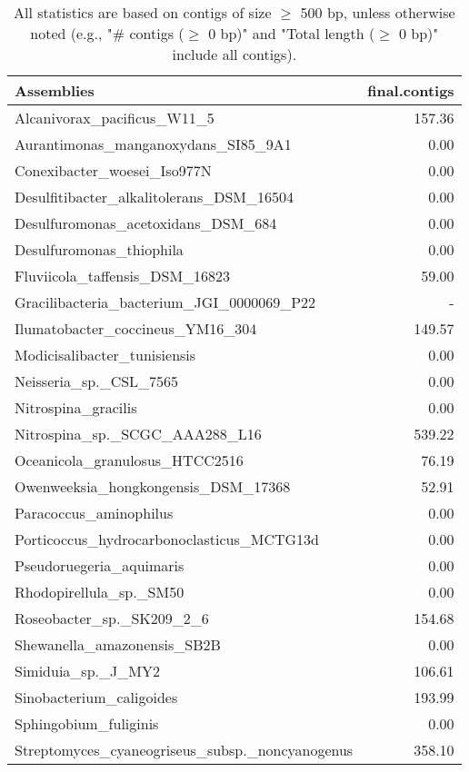 \documentclass[12pt,a4paper]{article}
\begin{document}
\begin{table}[ht]
\begin{center}
\caption{All statistics are based on contigs of size $\geq$ 500 bp, unless otherwise noted (e.g., "\# contigs ($\geq$ 0 bp)" and "Total length ($\geq$ 0 bp)" include all contigs).}
\begin{tabular}{|l*{1}{|r}|}
\hline
Assemblies & final.contigs \\ \hline
Alcanivorax\_pacificus\_W11\_5 & 157.36 \\ \hline
Aurantimonas\_manganoxydans\_SI85\_9A1 & 0.00 \\ \hline
Conexibacter\_woesei\_Iso977N & 0.00 \\ \hline
Desulfitibacter\_alkalitolerans\_DSM\_16504 & 0.00 \\ \hline
Desulfuromonas\_acetoxidans\_DSM\_684 & 0.00 \\ \hline
Desulfuromonas\_thiophila & 0.00 \\ \hline
Fluviicola\_taffensis\_DSM\_16823 & 59.00 \\ \hline
Gracilibacteria\_bacterium\_JGI\_0000069\_P22 & - \\ \hline
Ilumatobacter\_coccineus\_YM16\_304 & 149.57 \\ \hline
Modicisalibacter\_tunisiensis & 0.00 \\ \hline
Neisseria\_sp.\_CSL\_7565 & 0.00 \\ \hline
Nitrospina\_gracilis & 0.00 \\ \hline
Nitrospina\_sp.\_SCGC\_AAA288\_L16 & 539.22 \\ \hline
Oceanicola\_granulosus\_HTCC2516 & 76.19 \\ \hline
Owenweeksia\_hongkongensis\_DSM\_17368 & 52.91 \\ \hline
Paracoccus\_aminophilus & 0.00 \\ \hline
Porticoccus\_hydrocarbonoclasticus\_MCTG13d & 0.00 \\ \hline
Pseudoruegeria\_aquimaris & 0.00 \\ \hline
Rhodopirellula\_sp.\_SM50 & 0.00 \\ \hline
Roseobacter\_sp.\_SK209\_2\_6 & 154.68 \\ \hline
Shewanella\_amazonensis\_SB2B & 0.00 \\ \hline
Simiduia\_sp.\_J\_MY2 & 106.61 \\ \hline
Sinobacterium\_caligoides & 193.99 \\ \hline
Sphingobium\_fuliginis & 0.00 \\ \hline
Streptomyces\_cyaneogriseus\_subsp.\_noncyanogenus & 358.10 \\ \hline

\end{tabular}
\end{center}
\end{table}
\end{document}
